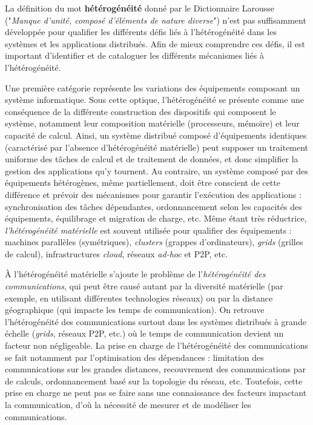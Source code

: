 
La définition du mot \textbf{hétérogénéité} donné par le Dictionnaire Larousse ("\textit{Manque d'unité, composé d'éléments de nature diverse}") n'est pas suffisamment développée pour qualifier les différents défis liés à l'hétérogénéité dans les systèmes et les applications distribués. Afin de mieux comprendre ces défis, il est important d'identifier et de cataloguer les différents mécanismes liés à l'hétérogénéité.

Une première catégorie représente les variations des équipements composant un système informatique. Sous cette optique, l'hétérogénéité se présente comme une conséquence de la différente construction des dispositifs qui composent le système, notamment leur composition matérielle (processeurs, mémoire) et leur capacité de calcul. Ainsi, un système distribué composé d'équipements identiques (caractérisé par l'absence d'hétérogénéité matérielle) peut supposer un traitement uniforme des tâches de calcul et de traitement de données, et donc simplifier la gestion des applications qu'y tournent. Au contraire, un système composé par des équipements hétérogènes, même partiellement, doit être conscient de cette différence et prévoir des mécanismes pour garantir l'exécution des applications : synchronisation des tâches dépendantes, ordonnancement selon les capacités des équipements, équilibrage et migration de charge, etc.  Même étant très réductrice, \textit{l'hétérogénéité matérielle} est souvent utilisée pour qualifier des équipements : machines parallèles (symétriques), \textit{clusters} (grappes d'ordinateurs), \textit{grids} (grilles de calcul), infrastructures \textit{cloud}, réseaux \textit{ad-hoc} et P2P, etc.

À l'hétérogénéité matérielle s'ajoute le problème de l'\textit{hétérogénéité des communications}, qui peut être causé autant par la diversité matérielle (par exemple, en utilisant différentes technologies réseaux) ou par la distance géographique (qui impacte les temps de communication). On retrouve l'hétérogénéité des communications surtout dans les systèmes distribués à grande échelle (\textit{grids}, réseaux P2P, etc.) où le temps de communication devient un facteur non négligeable. La prise en charge de l'hétérogénéité des communications se fait notamment par l'optimisation des dépendances : limitation des communications sur les grandes distances,  recouvrement des communications par de calculs, ordonnancement basé sur la topologie du réseau, etc. Toutefois, cette prise en charge ne peut pas se faire sans une connaissance des facteurs impactant la communication, d'où la nécessité de mesurer et de modéliser les communications. 

